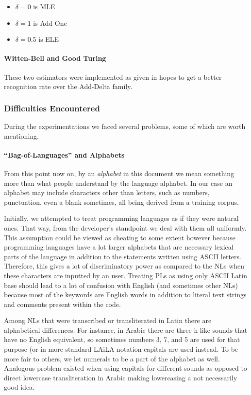 \begin{itemize}
\item $\delta = 0$ is MLE
\item $\delta = 1$ is Add One
\item $\delta = 0.5$ is ELE
\end{itemize}

\paragraph{Witten-Bell and Good Turing}

These two estimators were implemented as given in hopes to get a better
recognition rate over the Add-Delta family.

\subsubsection{Difficulties Encountered}

During the experimentations we faced several problems, some of which
are worth mentioning.

\paragraph{``Bag-of-Languages'' and Alphabets}

From this point now on, by an {\em alphabet} in this document we mean something more than what people understand
by the language alphabet. In our case an alphabet may include
characters other than letters, such as numbers, punctuation, even
a blank sometimes, all being derived from a training corpus.

Initially, we attempted to treat programming languages as if they
were natural ones. That way, from the developer's standpoint we deal with
them all uniformly. This assumption could be viewed as cheating
to some extent however because programming languages have a lot larger
alphabets that are necessary lexical parts of the language in addition
to the statements written using ASCII letters. Therefore, this gives a lot of
discriminatory power as compared to the NLs when these characters are
inputted by an user. Treating PLs as using
only ASCII Latin base should lead to a lot
of confusion with English (and sometimes other NLs) because most of the keywords
are English words in addition to literal text strings and comments present within the code.

Among NLs that were transcribed or transliterated in Latin there are alphabetical differences.
For instance, in Arabic there are three h-like sounds that have no
English equivalent, so sometimes numbers 3, 7, and 5 are used for that purpose (or in more
standard LAiLA notation \cite{qalam} capitals are used instead. To be
more fair to others, we let numerals to be a part of the alphabet as well.
Analogous problem existed when using capitals for different sounds as opposed
to direct lowercase transliteration in Arabic making lowercasing
a not necessarily good idea.

